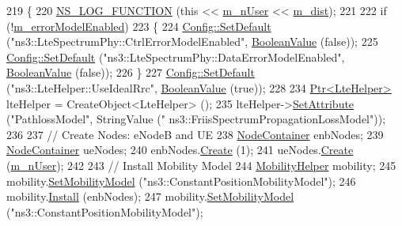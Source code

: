 \begin{DoxyCode}
219 \{
220   \hyperlink{log-macros-disabled_8h_a90b90d5bad1f39cb1b64923ea94c0761}{NS\_LOG\_FUNCTION} (\textcolor{keyword}{this} << \hyperlink{classLenaPfFfMacSchedulerTestCase1_a1d8b06961a8b7e440f643688069b9c7a}{m\_nUser} << \hyperlink{classLenaPfFfMacSchedulerTestCase1_a40c463f5ae7fae52ca0f5ab1ed838a00}{m\_dist});
221 
222   \textcolor{keywordflow}{if} (!\hyperlink{classLenaPfFfMacSchedulerTestCase1_a0bf76f059ed7435f6f1a281336b5c9fa}{m\_errorModelEnabled})
223     \{
224       \hyperlink{group__config_ga2e7882df849d8ba4aaad31c934c40c06}{Config::SetDefault} (\textcolor{stringliteral}{"ns3::LteSpectrumPhy::CtrlErrorModelEnabled"}, 
      \hyperlink{classns3_1_1BooleanValue}{BooleanValue} (\textcolor{keyword}{false}));
225       \hyperlink{group__config_ga2e7882df849d8ba4aaad31c934c40c06}{Config::SetDefault} (\textcolor{stringliteral}{"ns3::LteSpectrumPhy::DataErrorModelEnabled"}, 
      \hyperlink{classns3_1_1BooleanValue}{BooleanValue} (\textcolor{keyword}{false}));
226     \}
227   \hyperlink{group__config_ga2e7882df849d8ba4aaad31c934c40c06}{Config::SetDefault} (\textcolor{stringliteral}{"ns3::LteHelper::UseIdealRrc"}, 
      \hyperlink{classns3_1_1BooleanValue}{BooleanValue} (\textcolor{keyword}{true}));
228 
234   \hyperlink{classns3_1_1Ptr}{Ptr<LteHelper>} lteHelper = CreateObject<LteHelper> ();
235   lteHelper->\hyperlink{classns3_1_1ObjectBase_ac60245d3ea4123bbc9b1d391f1f6592f}{SetAttribute} (\textcolor{stringliteral}{"PathlossModel"}, StringValue (\textcolor{stringliteral}{"
      ns3::FriisSpectrumPropagationLossModel"}));
236 
237   \textcolor{comment}{// Create Nodes: eNodeB and UE}
238   \hyperlink{classns3_1_1NodeContainer}{NodeContainer} enbNodes;
239   \hyperlink{classns3_1_1NodeContainer}{NodeContainer} ueNodes;
240   enbNodes.\hyperlink{classns3_1_1NodeContainer_a787f059e2813e8b951cc6914d11dfe69}{Create} (1);
241   ueNodes.\hyperlink{classns3_1_1NodeContainer_a787f059e2813e8b951cc6914d11dfe69}{Create} (\hyperlink{classLenaPfFfMacSchedulerTestCase1_a1d8b06961a8b7e440f643688069b9c7a}{m\_nUser});
242 
243   \textcolor{comment}{// Install Mobility Model}
244   \hyperlink{classns3_1_1MobilityHelper}{MobilityHelper} mobility;
245   mobility.\hyperlink{classns3_1_1MobilityHelper_a030275011b6f40682e70534d30280aba}{SetMobilityModel} (\textcolor{stringliteral}{"ns3::ConstantPositionMobilityModel"});
246   mobility.\hyperlink{classns3_1_1MobilityHelper_a07737960ee95c0777109cf2994dd97ae}{Install} (enbNodes);
247   mobility.\hyperlink{classns3_1_1MobilityHelper_a030275011b6f40682e70534d30280aba}{SetMobilityModel} (\textcolor{stringliteral}{"ns3::ConstantPositionMobilityModel"});

\end{DoxyCode}
